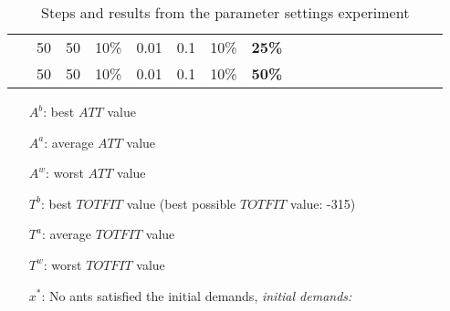 \begin{table}
\begin{tabular}{|l|l|l|l|l|l|l|l|l||l|l|l|l|l|l|}
    ~ & 50 & 50 & 10\% & 0.01 & 0.1 & 10\% & \textbf{25\%} & ~ & ~ & ~ & ~ & ~ & ~ & ~ \\
    ~ & 50 & 50 & 10\% & 0.01 & 0.1 & 10\% & \textbf{50\%} & ~ & ~ & ~ & ~ & ~ & ~ & ~ \\
    \hline
    \end{tabular}
    \caption {Steps and results from the parameter settings experiment} 
    \begin{itemize}[noitemsep]
    \item[$A^b$:] best $ATT$ value
    \item[$A^a$:] average $ATT$ value
    \item[$A^w$:] worst $ATT$ value
    \item[$T^b$:] best $TOTFIT$ value (best possible $TOTFIT$ value: -315)
    \item[$T^a$:] average $TOTFIT$ value
    \item[$T^w$:] worst $TOTFIT$ value
    \item[$x^*$:] No ants satisfied the initial demands, \emph{\color{red} initial demands: }
    \end{itemize}
    \label{table:parameterSettings}
\end{table}

